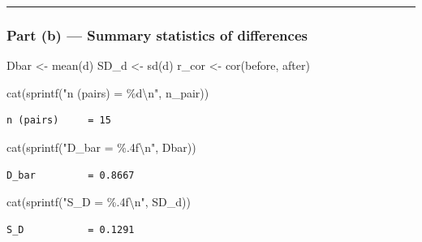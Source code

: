 \documentclass[
  letterpaper,
  DIV=11,
  numbers=noendperiod]{scrartcl}
\newenvironment{Shaded}{\begin{snugshade}}{\end{snugshade}}
\newcommand{\FunctionTok}[1]{\textcolor[rgb]{0.28,0.35,0.67}{#1}}
\newcommand{\NormalTok}[1]{\textcolor[rgb]{0.00,0.23,0.31}{#1}}
\newcommand{\OtherTok}[1]{\textcolor[rgb]{0.00,0.23,0.31}{#1}}
\newcommand{\SpecialCharTok}[1]{\textcolor[rgb]{0.37,0.37,0.37}{#1}}
\newcommand{\StringTok}[1]{\textcolor[rgb]{0.13,0.47,0.30}{#1}}
\begin{document}
\begin{center}\rule{0.5\linewidth}{0.5pt}\end{center}

\subsubsection{Part (b) --- Summary statistics of
differences}\label{part-b-summary-statistics-of-differences}

\begin{Shaded}
\begin{Highlighting}[]
\NormalTok{Dbar  }\OtherTok{\textless{}{-}} \FunctionTok{mean}\NormalTok{(d)}
\NormalTok{SD\_d  }\OtherTok{\textless{}{-}} \FunctionTok{sd}\NormalTok{(d)}
\NormalTok{r\_cor }\OtherTok{\textless{}{-}} \FunctionTok{cor}\NormalTok{(before, after)}

\FunctionTok{cat}\NormalTok{(}\FunctionTok{sprintf}\NormalTok{(}\StringTok{"n (pairs)     = \%d}\SpecialCharTok{\textbackslash{}n}\StringTok{"}\NormalTok{,   n\_pair))}
\end{Highlighting}
\end{Shaded}

\begin{verbatim}
n (pairs)     = 15
\end{verbatim}

\begin{Shaded}
\begin{Highlighting}[]
\FunctionTok{cat}\NormalTok{(}\FunctionTok{sprintf}\NormalTok{(}\StringTok{"D\_bar         = \%.4f}\SpecialCharTok{\textbackslash{}n}\StringTok{"}\NormalTok{, Dbar))}
\end{Highlighting}
\end{Shaded}

\begin{verbatim}
D_bar         = 0.8667
\end{verbatim}

\begin{Shaded}
\begin{Highlighting}[]
\FunctionTok{cat}\NormalTok{(}\FunctionTok{sprintf}\NormalTok{(}\StringTok{"S\_D           = \%.4f}\SpecialCharTok{\textbackslash{}n}\StringTok{"}\NormalTok{, SD\_d))}
\end{Highlighting}
\end{Shaded}

\begin{verbatim}
S_D           = 0.1291
\end{verbatim}
\end{document}
